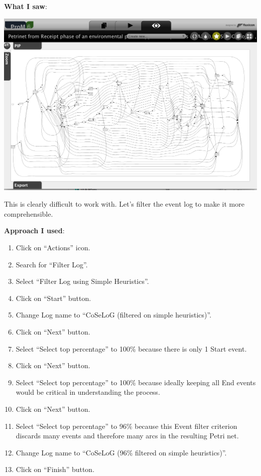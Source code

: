 \documentclass[]{article}
\begin{document}
\textbf{What I saw}:

\includegraphics{CoSeLoG_Step_05.png}

This is clearly difficult to work with. Let's filter the event log to
make it more comprehensible.

\textbf{Approach I used}:

\begin{enumerate}
\def\labelenumi{\arabic{enumi}.}
\setcounter{enumi}{5}
\itemsep1pt\parskip0pt
\item
  Click on ``Actions'' icon.\\
\item
  Search for ``Filter Log''.\\
\item
  Select ``Filter Log using Simple Heuristics''.\\
\item
  Click on ``Start'' button.
\item
  Change Log name to ``CoSeLoG (filtered on simple heuristics)''.\\
\item
  Click on ``Next'' button.
\item
  Select ``Select top percentage'' to 100\% because there is only 1
  Start event.
\item
  Click on ``Next'' button.
\item
  Select ``Select top percentage'' to 100\% because ideally keeping all
  End events would be critical in understanding the process.\\
\item
  Click on ``Next'' button.
\item
  Select ``Select top percentage'' to 96\% because this Event filter
  criterion discards many events and therefore many arcs in the
  resulting Petri net.
\item
  Change Log name to ``CoSeLoG (96\% filtered on simple heuristics)''.\\
\item
  Click on ``Finish'' button.
\end{enumerate}
\end{document}
